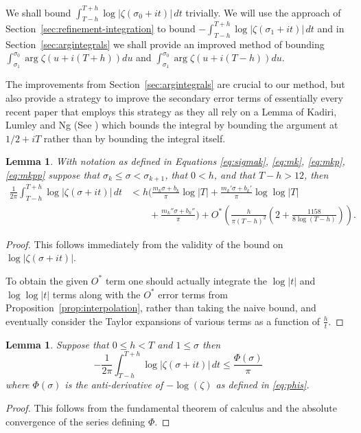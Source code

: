 \documentclass[10pt,english,letter, reqno]{amsart}
\newcommand{\Ostar}{O^{\ast}}
\theoremstyle{plain}
\newtheorem{lemma}[theorem]{Lemma}
\theoremstyle{definition}
\begin{document}
We shall bound $\int_{T-h}^{T+h} \log|\zeta(\sigma_0 +it)|\,dt$ trivially.
We will use the approach of Section~\ref{sec:refinement-integration} to bound $-\int_{T-h}^{T+h} \log|\zeta(\sigma_1 +it)|\,dt$ and in Section~\ref{sec:argintegrals} we shall provide an improved method of bounding $\int_{\sigma_1}^{\sigma_0} \arg \zeta(u+i(T+h)) du$ and $\int_{\sigma_1}^{\sigma_0} \arg \zeta(u+i(T-h)) du$.

The improvements from Section~\ref{sec:argintegrals} are crucial to our method, but also provide a strategy to improve the secondary error terms of essentially every recent paper that employs this strategy as they all rely on a Lemma of Kadiri, Lumley and Ng (See \cite[Lemma~4.12]{KadiriLumleyNg2018}) which bounds the integral by bounding the argument at $1/2+iT$ rather than by bounding the integral itself.


\begin{lemma}\label{lemma:littlewood-mainterm}
With notation as defined in Equations \eqref{eq:sigmak}, \eqref{eq:mk}, \eqref{eq:mkp}, \eqref{eq:mkpp} suppose that $\sigma_k\leq\sigma < \sigma_{k+1}$, that $0<h$, and that $T-h>12$,
then
\begin{align*}  \frac{1}{2\pi}\int_{T-h}^{T+h} \log|\zeta(\sigma +it)|\,dt &< h\Biggl(\frac{m_k\sigma + b_k}{\pi}\log|T| + \frac{m_k'\sigma + b_k'}{\pi}\log\log|T| \\&\qquad + \frac{m_k''\sigma + b_k''}{\pi}\Biggr) +  \Ostar\!\left(\frac{h}{\pi(T-h)^2}\left(2+\frac{1158}{8\log(T-h)}\right)\right) .
\end{align*}
\end{lemma}
\begin{proof}
This follows immediately from the validity of the bound on $\log|\zeta(\sigma +it)|$.

To obtain the given $\Ostar$ term one should actually integrate the $\log|t|$ and $\log\log|t|$ terms along with the $\Ostar$ error terms from Proposition~\ref{prop:interpolation}, rather than taking the naive bound, and eventually consider the Taylor expansions of various terms as a function of $\frac{h}{t}$.
\end{proof}

\begin{lemma}\label{lemma:littlewood-outerlog}
Suppose that $0\leq h < T$ and $1 \leq \sigma$ then
\[ -\frac{1}{2\pi}\int_{T-h}^{T+h} \log|\zeta(\sigma +it)|\,dt \leq \frac{\Phi(\sigma)}{\pi}
\]
where $\Phi(\sigma)$ is the anti-derivative of $-\log(\zeta)$ as defined in \eqref{eq:phis}.
\end{lemma}
 \begin{proof}
This follows from the fundamental theorem of calculus and the absolute convergence of the series defining $\Phi$.
\end{proof}
\end{document}
